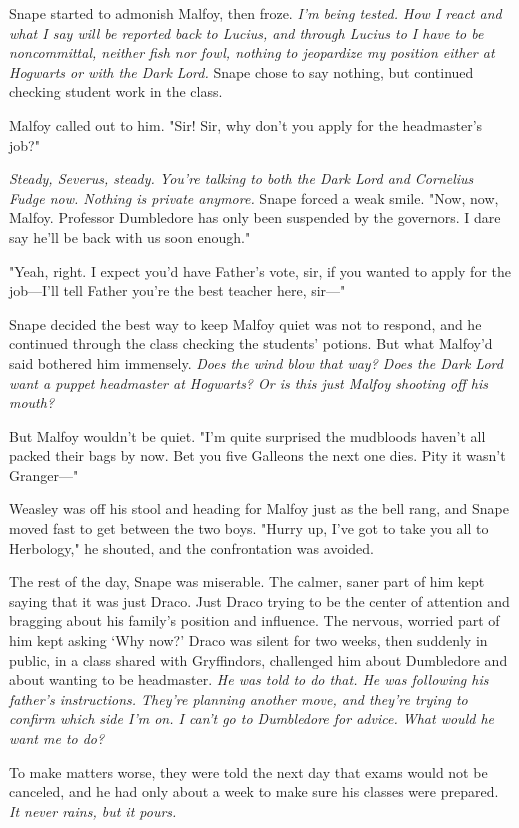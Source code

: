 Snape started to admonish Malfoy, then froze. \emph{I'm being tested. How I react and what I say will be reported back to Lucius, and through Lucius to{\el} I have to be noncommittal, neither fish nor fowl, nothing to jeopardize my position either at Hogwarts or with the Dark Lord.} Snape chose to say nothing, but continued checking student work in the class.

Malfoy called out to him. "Sir! Sir, why don't you apply for the headmaster's job?"

\emph{Steady, Severus, steady. You're talking to both the Dark Lord and Cornelius Fudge now. Nothing is private anymore.} Snape forced a weak smile. "Now, now, Malfoy. Professor Dumbledore has only been suspended by the governors. I dare say he'll be back with us soon enough."

"Yeah, right. I expect you'd have Father's vote, sir, if you wanted to apply for the job—I'll tell Father you're the best teacher here, sir—"

Snape decided the best way to keep Malfoy quiet was not to respond, and he continued through the class checking the students' potions. But what Malfoy'd said bothered him immensely. \emph{Does the wind blow that way? Does the Dark Lord want a puppet headmaster at Hogwarts? Or is this just Malfoy shooting off his mouth?}

But Malfoy wouldn't be quiet. "I'm quite surprised the mudbloods haven't all packed their bags by now. Bet you five Galleons the next one dies. Pity it wasn't Granger—"

Weasley was off his stool and heading for Malfoy just as the bell rang, and Snape moved fast to get between the two boys. "Hurry up, I've got to take you all to Herbology," he shouted, and the confrontation was avoided.

The rest of the day, Snape was miserable. The calmer, saner part of him kept saying that it was just Draco. Just Draco trying to be the center of attention and bragging about his family's position and influence. The nervous, worried part of him kept asking `Why now?' Draco was silent for two weeks, then suddenly in public, in a class shared with Gryffindors, challenged him about Dumbledore and about wanting to be headmaster. \emph{He was told to do that. He was following his father's instructions. They're planning another move, and they're trying to confirm which side I'm on. I can't go to Dumbledore for advice. What would he want me to do?}

To make matters worse, they were told the next day that exams would not be canceled, and he had only about a week to make sure his classes were prepared. \emph{It never rains, but it pours.}

